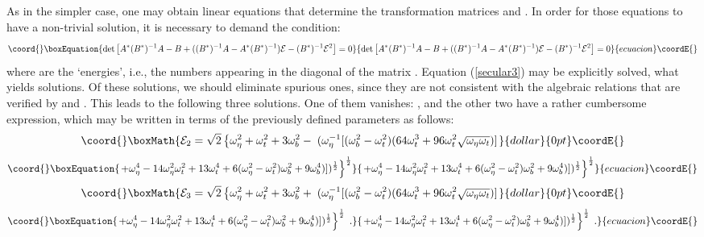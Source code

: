 \documentclass[a4paper,12pt]{article}
\begin{document}
As in the simpler \coordHE{} case, one may obtain linear equations that determine 
the transformation matrices \coordHE{} and \coordHE{}. In order for those equations to have 
a non-trivial solution, it is necessary to demand the condition:
\begin{equation}\coord{}\boxEquation{
  \label{secular3}
\det\left[A^* (B^*)^{-1} A - B + ( (B^*)^{-1} A - A^* (B^*)^{-1}) {\mathcal E} - (B^*)^{-1} 
{\mathcal E}^2 \right] = 0
}{
  \det\left[A^* (B^*)^{-1} A - B + ( (B^*)^{-1} A - A^* (B^*)^{-1}) {\mathcal E} - (B^*)^{-1} 
{\mathcal E}^2 \right] = 0
}{ecuacion}\coordE{}\end{equation}
where \coordHE{} are the `energies', i.e., the numbers appearing in the
diagonal of the matrix \coordHE{}.
Equation (\ref{secular3}) may be explicitly solved, what yields \coordHE{} solutions.
Of these \coordHE{} solutions, we should eliminate \coordHE{} spurious ones, since they are
not consistent with the algebraic relations that are verified by \coordHE{} and \coordHE{}.
This leads to the following three solutions. One of them vanishes: 
\coordHE{}, and the other two have a rather cumbersome expression, which
may be written in terms of the previously defined \myHighlight{$\omega$}\coordHE{} parameters  as follows:
$$\coord{}\boxMath{
{\mathcal E}_2 = \sqrt{2}\left\{ \omega_\eta^2 + \omega_t^2 + 3 \omega_b^2 - \; ( \omega_\eta^{-1} [(\omega_b^2-\omega_t^2)( 64 \omega_t^3 + 96 \omega_t^2 \sqrt{\omega_\eta \omega_t})]
\right.
}{dollar}{0pt}\coordE{}$$
\begin{equation}\coord{}\boxEquation{
\left.
+ \omega_\eta^4 - 14 \omega_\eta^2 \omega_t^2 + 13 \omega_t^4 + 6 (\omega_\eta^2-\omega_t^2)\omega_b^2 + 9 \omega_b^4)])^{\frac{1}{2}} \right\}^{\frac{1}{2}}
}{
\left.
+ \omega_\eta^4 - 14 \omega_\eta^2 \omega_t^2 + 13 \omega_t^4 + 6 (\omega_\eta^2-\omega_t^2)\omega_b^2 + 9 \omega_b^4)])^{\frac{1}{2}} \right\}^{\frac{1}{2}}
}{ecuacion}\coordE{}\end{equation}
$$\coord{}\boxMath{
{\mathcal E}_3 = \sqrt{2}\left\{ \omega_\eta^2 + \omega_t^2 + 3 \omega_b^2 + \; ( \omega_\eta^{-1} [(\omega_b^2-\omega_t^2)( 64 \omega_t^3 + 96 \omega_t^2 \sqrt{\omega_\eta \omega_t})]
\right.
}{dollar}{0pt}\coordE{}$$
\begin{equation}\coord{}\boxEquation{
\left.
+ \omega_\eta^4 - 14 \omega_\eta^2 \omega_t^2 + 13 \omega_t^4 + 6 (\omega_\eta^2-\omega_t^2)\omega_b^2 + 9 \omega_b^4)])^{\frac{1}{2}} \right\}^{\frac{1}{2}} \;.  
}{
\left.
+ \omega_\eta^4 - 14 \omega_\eta^2 \omega_t^2 + 13 \omega_t^4 + 6 (\omega_\eta^2-\omega_t^2)\omega_b^2 + 9 \omega_b^4)])^{\frac{1}{2}} \right\}^{\frac{1}{2}} \;.  
}{ecuacion}\coordE{}\end{equation}
%
\end{document}
